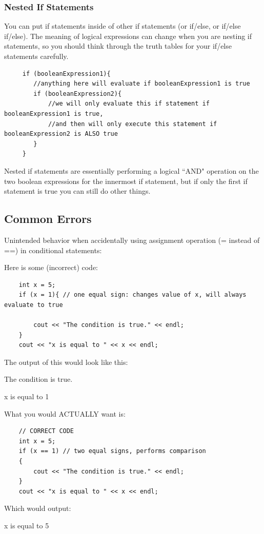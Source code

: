  \subsubsection{Nested If Statements}
 You can put if statements inside of other if statements (or if/else, or if/else if/else). The meaning of logical expressions can change when you are nesting if statements, so you should think through the truth tables for your if/else statements carefully. 

 \begin{verbatim}
     if (booleanExpression1){
        //anything here will evaluate if booleanExpression1 is true
        if (booleanExpression2){
            //we will only evaluate this if statement if booleanExpression1 is true, 
            //and then will only execute this statement if booleanExpression2 is ALSO true
        }
     }
 \end{verbatim}

 Nested if statements are essentially performing a logical ``AND" operation on the two boolean expressions for the innermost if statement, but if only the first if statement is true you can still do other things. 

\subsection{Common Errors}


Unintended behavior when accidentally using assignment operation (= instead of ==) in conditional statements:

\begin{example}
    Here is some (incorrect) code:

    \begin{verbatim}
    int x = 5;
    if (x = 1){ // one equal sign: changes value of x, will always evaluate to true
    
        cout << "The condition is true." << endl;
    }
    cout << "x is equal to " << x << endl;
    \end{verbatim}
    The output of this would look like this:
    \begin{sample}
The condition is true.

x is equal to 1
    \end{sample}
    What you would ACTUALLY want is:
    \begin{verbatim}
    // CORRECT CODE
    int x = 5;
    if (x == 1) // two equal signs, performs comparison
    {
        cout << "The condition is true." << endl;
    }
    cout << "x is equal to " << x << endl;
    \end{verbatim}
    Which would output:
    \begin{sample}
x is equal to 5
    \end{sample}
\end{example}

